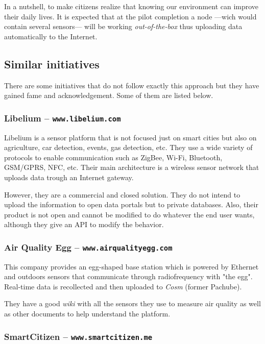 \documentclass[a4paper,english]{article}
\begin{document}
        In a nutshell, to make citizens realize that knowing our environment can improve their daily lives. It is expected that at the pilot completion a node ---wich would contain several sensors--- will be working \emph{out-of-the-box} thus uploading data automatically to the Internet.


    \subsection{Similar initiatives}

        There are some initiatives that do not follow exactly this approach but they have gained fame and acknowledgement. Some of them are listed below.

        \subsubsection{Libelium -- \texttt{www.libelium.com}}
            
            Libelium is a sensor platform that is not focused just on smart cities but also on agriculture, car detection, events, gas detection, etc. They use a wide variety of protocols to enable communication such as ZigBee, Wi-Fi, Bluetooth, GSM/GPRS, NFC, etc. Their main architecture is a wireless sensor network that uploads data trough an Internet gateway.

            However, they are a commercial and closed solution. They do not intend to upload the information to open data portals but to private databases. Also, their product is not open and cannot be modified to do whatever the end user wants, although they give an API to modify the behavior.

        \subsubsection{Air Quality Egg -- \texttt{www.airqualityegg.com}}

            This company provides an egg-shaped base station which is powered by Ethernet and outdoors sensors that communicate through radiofrequency with "the egg". Real-time data is recollected and then uploaded to \emph{Cosm} (former Pachube).

            They have a good \emph{wiki} with all the sensors they use to measure air quality as well as other documents to help understand the platform. 

            \subsubsection{SmartCitizen -- \texttt{www.smartcitizen.me}}
\end{document}
